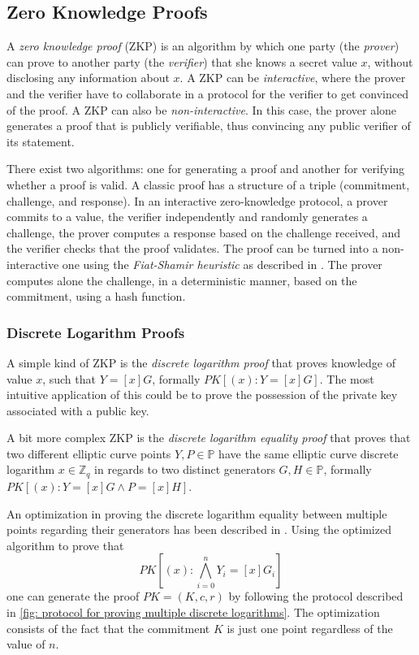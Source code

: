 \clearpage
\subsection{Zero Knowledge Proofs}
A \textit{zero knowledge proof} (ZKP) is an algorithm by which one party (the \textit{prover}) can prove to another party (the \textit{verifier}) that she knows a secret value $x$, without disclosing any information about $x$. A ZKP can be \textit{interactive}, where the prover and the verifier have to collaborate in a protocol for the verifier to get convinced of the proof. A ZKP can also be \textit{non-interactive}. In this case, the prover alone generates a proof that is publicly verifiable, thus convincing any public verifier of its statement. 

There exist two algorithms: one for generating a proof and another for verifying whether a proof is valid. A classic proof has a structure of a triple (commitment, challenge, and response). In an interactive zero-knowledge protocol, a prover commits to a value, the verifier independently and randomly generates a challenge, the prover computes a response based on the challenge received, and the verifier checks that the proof validates. The proof can be turned into a non-interactive one using the \textit{Fiat-Shamir heuristic} as described in \cite{Fiat87}. The prover computes alone the challenge, in a deterministic manner, based on the commitment, using a hash function.


\subsubsection{Discrete Logarithm Proofs} \label{app: discrete logarithm proofs}
A simple kind of ZKP is the \textit{discrete logarithm proof} that proves knowledge of value $x$, such that $Y = [x]G$, formally $PK[(x): Y = [x]G]$. The most intuitive application of this could be to prove the possession of the private key associated with a public key.

A bit more complex ZKP is the \textit{discrete logarithm equality proof} that proves that two different elliptic curve points $Y, P \in \mathbb{P}$ have the same elliptic curve discrete logarithm $x \in \mathbb{Z}_q$ in regards to two distinct generators $G, H \in \mathbb{P}$, formally $PK[(x): Y = [x]G \wedge P = [x]H]$.

An optimization in proving the discrete logarithm equality between multiple points regarding their generators has been described in \cite{Chow10}. Using the optimized algorithm to prove that
\[ PK[(x): \bigwedge_{i=0}^{n} Y_i = [x]G_i] \]
one can generate the proof $PK = (K, c, r)$ by following the protocol described in \cref{fig: protocol for proving multiple discrete logarithms}. The optimization consists of the fact that the commitment $K$ is just one point regardless of the value of $n$.

